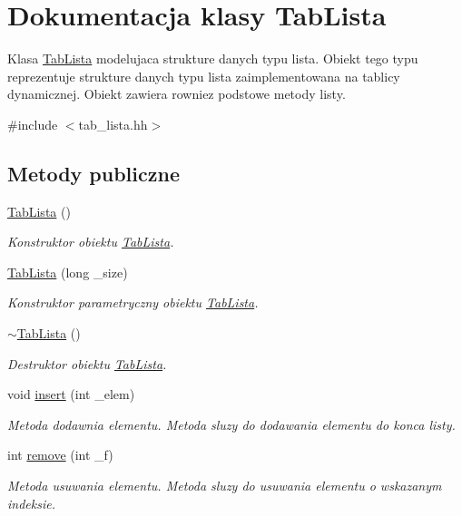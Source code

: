 \hypertarget{class_tab_lista}{\section{Dokumentacja klasy Tab\-Lista}
\label{class_tab_lista}
}


Klasa \hyperlink{class_tab_lista}{Tab\-Lista} modelujaca strukture danych typu lista. Obiekt tego typu reprezentuje strukture danych typu lista zaimplementowana na tablicy dynamicznej. Obiekt zawiera rowniez podstowe metody listy.  




{\ttfamily \#include $<$tab\-\_\-lista.\-hh$>$}

\subsection*{Metody publiczne}
\begin{DoxyCompactItemize}
\item 
\hyperlink{class_tab_lista_ad3bfa98306e98b4e5bb7ff524e72078c}{Tab\-Lista} ()
\begin{DoxyCompactList}\small\item\em Konstruktor obiektu \hyperlink{class_tab_lista}{Tab\-Lista}. \end{DoxyCompactList}\item 
\hyperlink{class_tab_lista_a95d23d52e0af187351b3fc1022ae4839}{Tab\-Lista} (long \-\_\-size)
\begin{DoxyCompactList}\small\item\em Konstruktor parametryczny obiektu \hyperlink{class_tab_lista}{Tab\-Lista}. \end{DoxyCompactList}\item 
\hyperlink{class_tab_lista_a0b4a808158b370bbc5785ceef760a273}{$\sim$\-Tab\-Lista} ()
\begin{DoxyCompactList}\small\item\em Destruktor obiektu \hyperlink{class_tab_lista}{Tab\-Lista}. \end{DoxyCompactList}\item 
void \hyperlink{class_tab_lista_a7bd3e5f62a81bfd3813ad874e8a9c059}{insert} (int \-\_\-elem)
\begin{DoxyCompactList}\small\item\em Metoda dodawnia elementu. Metoda sluzy do dodawania elementu do konca listy. \end{DoxyCompactList}\item 
int \hyperlink{class_tab_lista_aae59a3eafbbd7424a952badb26410a5e}{remove} (int \-\_\-f)
\begin{DoxyCompactList}\small\item\em Metoda usuwania elementu. Metoda sluzy do usuwania elementu o wskazanym indeksie. \end{DoxyCompactList}\end{DoxyCompactItemize}
